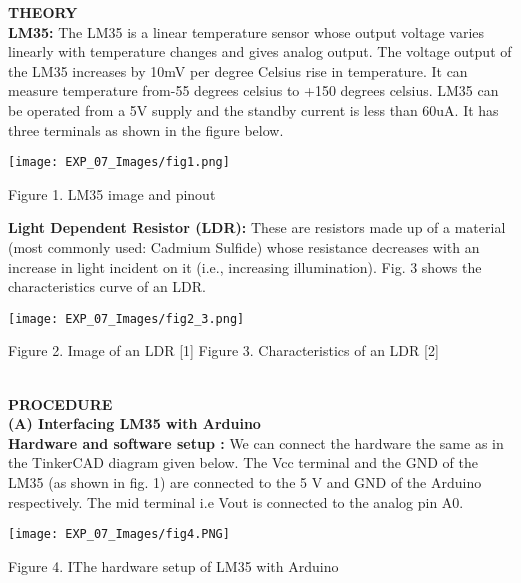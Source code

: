 \documentclass[12pt,a4paper]{article}
\begin{document}
\begin{justify}
\textbf{\large THEORY}\\[3pt]
\textbf{LM35:} The LM35 is a linear temperature sensor whose output voltage varies linearly with temperature changes and gives analog output. The voltage output of the LM35 increases by 10mV per degree Celsius rise in temperature. It can measure temperature from-55 degrees celsius to +150 degrees celsius.  LM35 can be operated from a 5V supply and the standby current is less than 60uA. It has three terminals as shown in the figure below.

\begin{center} 
\texttt{[image: EXP\_07\_Images/fig1.png]}
\end{center}

\begin{center} {Figure 1. LM35 image and pinout}\end{center}

\noindent \textbf{Light Dependent Resistor (LDR): }These are resistors made up of a material (most commonly used: Cadmium Sulfide) whose resistance decreases with an increase in light incident on it (i.e., increasing illumination). Fig. 3  shows the characteristics curve of an LDR.

\begin{center} 
\texttt{[image: EXP\_07\_Images/fig2\_3.png]}
\end{center}

\begin{center} {Figure 2. Image of an LDR [1] \hspace{12pt}   Figure 3. Characteristics of  an LDR [2] }\end{center}\\[21pt]

\noindent \textbf{\large PROCEDURE}\\[3pt]
\textbf{(A)	Interfacing LM35 with Arduino}\\[3pt]
\textbf{Hardware and software setup : }We can connect the hardware the same as in the TinkerCAD diagram given below. The Vcc terminal and the GND  of the LM35 (as shown in fig. 1) are connected to the 5 V and GND of the Arduino respectively. The mid terminal i.e Vout is connected to the analog pin A0.

\begin{center} 
\texttt{[image: EXP\_07\_Images/fig4.PNG]}
\end{center}

\begin{center} {Figure 4. IThe hardware setup of LM35 with Arduino}\end{center}


\end{justify}
\end{document}
